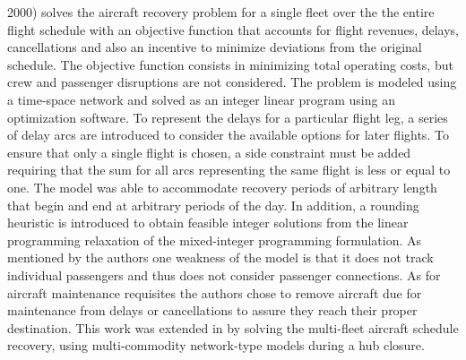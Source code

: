 \documentclass[ijoo,nonblindrev]{informs-ijoo}
\begin{document}
\citep{THENGVALL2000} 2000) solves the aircraft recovery problem for a single fleet over the the entire flight schedule with an objective function that accounts for flight revenues, delays, cancellations and also an incentive to minimize deviations from the original schedule. The objective function consists in minimizing total operating costs, but crew and passenger disruptions are not considered. The problem is modeled using a time-space network and solved as an integer linear program using an optimization software.  To  represent the delays for a particular flight leg, a series  of delay arcs are introduced to consider the available options for later flights.  To  ensure   that only a single flight is chosen, a side constraint must be added requiring that the sum   for all arcs representing the same flight is less or equal to one. The model was able to accommodate recovery periods of arbitrary length that begin and end at arbitrary periods of the day. In addition, a rounding heuristic is introduced to obtain feasible integer solutions from the linear programming relaxation of the mixed-integer programming formulation. As mentioned by the authors one weakness of the model is that it does not track individual passengers and thus does not consider passenger connections. As for aircraft maintenance requisites the authors chose to remove aircraft due for maintenance from delays or cancellations to assure they reach their proper destination. This work was extended in \citep{Thengvall2001} by solving the multi-fleet aircraft schedule recovery, using multi-commodity network-type models during a hub closure.\\
\end{document}
